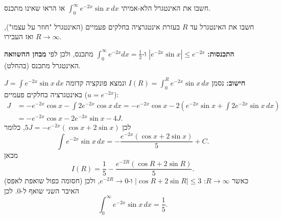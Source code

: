 
\begin{question}
חשבו את האינטגרל הלא-אמיתי $\displaystyle\int_0^{\infty}e^{-2x}\sin x\,dx$ או הראו שאינו מתכנס.
\end{question}

\begin{hint}
חשבו את האינטגרל עד $R$ בעזרת אינטגרציה בחלקים פעמיים (האינטגרל "חוזר על עצמו"), ואז העבירו $R\to\infty$.
\end{hint}

\begin{solution}
\textbf{התכנסות:} $|e^{-2x}\sin x|\le e^{-2x}$ ו-$\int_0^\infty e^{-2x}dx=\frac12$ מתכנס, ולכן לפי \textbf{מבחן ההשוואה} האינטגרל מתכנס (בהחלט).

\textbf{חישוב:} נסמן $I(R)=\int_0^R e^{-2x}\sin x\,dx$ ונמצא פונקציה קדומה $J=\int e^{-2x}\sin x\,dx$ באינטגרציה בחלקים פעמיים ($u=e^{-2x}$):
\begin{align*}
J&=-e^{-2x}\cos x-\int 2e^{-2x}\cos x\,dx
 =-e^{-2x}\cos x-2\left(e^{-2x}\sin x+\int 2e^{-2x}\sin x\,dx\right)\\
 &=-e^{-2x}\cos x-2e^{-2x}\sin x-4J.
\end{align*}
לכן $5J=-e^{-2x}(\cos x+2\sin x)$, כלומר
\[ \int e^{-2x}\sin x\,dx=-\frac{e^{-2x}(\cos x+2\sin x)}{5}+C. \]
מכאן
\[ I(R)=\frac{1}{5}-\frac{e^{-2R}(\cos R+2\sin R)}{5}. \]
כאשר $R\to\infty$: $|\cos R+2\sin R|\le 3$ ו-$e^{-2R}\to 0$, ולכן (חסומה כפול שואפת לאפס) האיבר השני שואף ל-$0$. לכן
\[ \int_0^\infty e^{-2x}\sin x\,dx=\frac15. \]
\end{solution}
